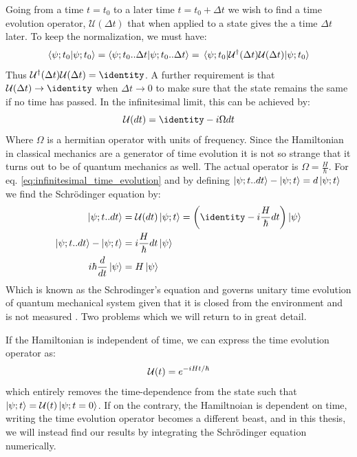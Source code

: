 Going from a time $t = t_0$ to a later time $t = t_0 + \Delta t$ we wish to find a time evolution operator, $\mathcal{U}(\Delta t)$ that when applied to a state gives the a time $\Delta t$ later. To keep the normalization, we must have:
\begin{equation}
    \braket{\psi; t_0}{\psi; t_0} = \braket{\psi; t_0 .. \Delta t}{\psi; t_0 .. \Delta t} = \mel{\psi; t_0}{\mathcal{U}^\dagger (\Delta t) \mathcal{U}(\Delta t)}{\psi; t_0} 
\end{equation}
Thus $\unitary^\dagger (\Delta t) \unitary(\Delta t) = \identity$. A further requirement is that $\unitary(\Delta t)\to \identity$ when $\Delta t \to 0$ to make sure that the state remains the same if no time has passed. In the infinitesimal limit, this can be achieved by:
\begin{equation}\label{eq:infinitesimal_time_evolution}
    \unitary(dt) = \identity - i \Omega dt
\end{equation}
Where $\Omega$ is a hermitian operator with units of frequency. Since the Hamiltonian in classical mechanics are a generator of time evolution it is not so strange that it turns out to be of quantum mechanics as well. The actual operator is $\Omega = \frac{H}{\hbar}$. For eq. \ref{eq:infinitesimal_time_evolution} and by defining $\ket{\psi; t..dt} - \ket{\psi; t} = d\ket{\psi; t}$ we find the Schrödinger equation by:
\begin{align}
    \ket{\psi; t..dt} &= \unitary(dt) \ket{\psi; t} = \left(\identity - i \frac{H}{\hbar}   dt\right) \ket{\psi} \\
    \ket{\psi; t..dt} - \ket{\psi; t} &= i \frac{H}{\hbar}   dt \ket{\psi} \\
    i \hbar \frac{d}{dt}\ket{\psi} &=  H \ket{\psi}
\end{align}
Which is known as the Schrodinger's equation and governs unitary time evolution of quantum mechanical system given that it is closed from the environment and is not measured \cite{sakurai_modern_2021}. Two problems which we will return to in great detail.

If the Hamiltonian is independent of time, we can express the time evolution operator as:
\begin{equation}
    \mathcal{U}(t) = e^{-iHt/\hbar}
\end{equation}
which entirely removes the time-dependence from the state such that $\ket{\psi; t} = \mathcal{U}(t)\ket{\psi; t = 0}$.
If on the contrary, the Hamiltnoian is dependent on time,  writing the time evolution operator becomes a different beast, and in this thesis, we will instead find our results by integrating the Schrödinger equation numerically.

